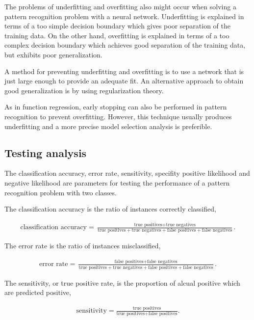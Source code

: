 The problems of underfitting and overfitting also might occur when solving a pattern recognition problem with a neural network. 
Underfitting is explained in terms of a too simple decision boundary which gives poor separation of the training data. 
On the other hand, overfitting is explained in terms of a too complex decision boundary which achieves good separation of the training
data, but exhibits poor generalization.

A method for preventing underfitting and overfitting is to use a network that is just large enough to provide an adequate fit. 
An alternative approach to obtain good generalization is by using regularization theory.

As in function regression, early stopping can also be performed in pattern recognition to prevent overfitting. 
However, this technique usually produces underfitting and a more precise model selection analysis is preferible. 

\subsection*{Testing analysis}


The classification accuracy, error rate, sensitivity, specifity positive likelihood and negative likelihood are parameters for testing the performance of a pattern recognition problem with two classes. 

The classification accuracy is the ratio of instances correctly classified,  

\begin{eqnarray}\nonumber
\text{classification accuracy} = \frac{\text{true positives} + \text{true negatives}}{\text{true positives}+\text{true negatives}+\text{false positives}+\text{false negatives}}.
\end{eqnarray}

The error rate is the ratio of instances misclassified, 

\begin{eqnarray}\nonumber
\text{error rate} = \frac{\text{false positives} + \text{false negatives}}{\text{true positives}+\text{true negatives}+\text{false positives}+\text{false negatives}}.
\end{eqnarray}

The sensitivity, or true positive rate, is the proportion of alcual positive which are predicted positive, 

\begin{eqnarray}\nonumber
\text{sensitivity} = \frac{\text{true positives}}{\text{true positives}+\text{false positives}}.
\end{eqnarray}


